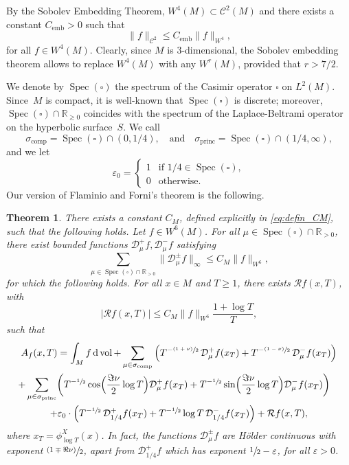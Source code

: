 \documentclass[10pt]{amsart}
\newcommand{\psfrac}[2]{\sfrac{(#1)}{#2}}
\newcommand \R{\mathbb{R}}
\newcommand*{\diff}{\mathop{}\!\mathrm{d}}
\newcommand{\Dp}[1]{\mathcal{D}_\mu^{+} #1}
\newcommand{\Dm}[1]{\mathcal{D}_\mu^{-} #1}
\newcommand{\Dpm}[1]{\mathcal{D}_\mu^{\pm} #1}
\newcommand{\aver}[1]{A_{#1}(x,T)}
\DeclareMathOperator{\vol}{vol}
\DeclareMathOperator{\emb}{emb}
\DeclareMathOperator{\Spec}{Spec}
\DeclareMathOperator{\comp}{comp}
\DeclareMathOperator{\princ}{princ}
\newtheorem{theorem}{Theorem}
\theoremstyle{definition}
\begin{document}
By the Sobolev Embedding Theorem, $W^4(M) \subset \mathscr{C}^2(M)$ and there exists a constant $C_{\emb}>0$ such that
\[
\|f\|_{\mathscr{C}^2} \leq C_{\emb} \|f\|_{W^4},
\]
for all $f \in W^4(M)$. Clearly, since $M$ is 3-dimensional, the Sobolev embedding theorem allows to replace $W^4(M)$ with any $W^r(M)$, provided that $r > 7/2$.

We denote by $\Spec(\square)$ the spectrum of the Casimir operator $\square$ on $L^2(M)$.
Since~$M$ is compact, it is well-known that $\Spec(\square)$ is discrete; moreover, $\Spec(\square) \cap \R_{\geq 0}$ coincides with the spectrum of the Laplace-Beltrami operator on the hyperbolic surface~$S$. We call
\[
\sigma_{\comp} = \Spec(\square) \cap (0,1/4), \quad\text{and}\quad \sigma_{\princ} = \Spec(\square) \cap (1/4, \infty),
\]
and we let
\[
\varepsilon_0 =
\begin{cases}
1 & \text{if } 1/4 \in \Spec(\square),\\
0 & \text{otherwise}.
\end{cases}
\]
Our version of Flaminio and Forni's theorem is the following.
\begin{theorem}\label{thm:main_FF}
There exists a constant $C_M$, defined explicitly in \eqref{eq:defin_CM}, such that the following holds. Let $f \in W^6(M)$. For all $\mu \in \Spec(\square) \cap \R_{>0}$, there exist bounded functions $\Dp{f}, \Dm{f}$ satisfying
\[
\sum_{\mu \in \Spec(\square) \cap \R_{>0}} \|\Dpm{f}\|_{\infty} \leq C_M \|f \|_{W^6},
\]
for which the following holds. For all $x \in M$ and $T \geq 1$, there exists $\mathcal{R}f(x,T)$, with
\[
|\mathcal{R}f(x,T)|\leq C_M \|f \|_{W^6} \frac{1+ \log T}{T},
\]
such that
\begin{multline*}
\aver{f} = \int_M f \diff \vol + \sum_{\mu \in \sigma_{\comp}} \left(T^{-\psfrac{1+\nu}{2}} \, \Dp{f(x_T) } + T^{-\psfrac{1-\nu}{2}} \, \Dm{ f(x_T)} \right)\\
\shoveright{+ \sum_{\mu \in \sigma_{\princ}}\biggl(T^{-\sfrac{1}{2}} \cos\Bigl(\frac{\Im\nu}{2} \log T \Bigr) \Dp{ f(x_T)} + T^{-\sfrac{1}{2}} \sin\Bigl(\frac{\Im\nu}{2} \log T \Bigr) \Dm{ f(x_T)} \biggr)} \\
+ \varepsilon_0 \cdot \left(T^{-\sfrac{1}{2}} \, \mathcal{D}^{+}_{1/4} f(x_T) + T^{-\sfrac{1}{2}} \log T \, \mathcal{D}^{-}_{1/4} f(x_T) \right) + \mathcal{R}f(x,T),
\end{multline*}
where $x_T= \phi^X_{\log T}(x)$. In fact, the functions $\Dpm{f}$ are \emph{Hölder continuous} with exponent $\psfrac{1 \mp \Re\nu}{2}$, apart from $\mathcal{D}^{+}_{1/4}f$ which has exponent $\sfrac{1}{2}- \varepsilon$, for all $\varepsilon >0$.
\end{theorem}
\end{document}
